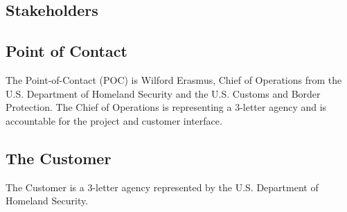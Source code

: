 \begin{fullwidth}
\section{Stakeholders}
\subsection{Point of Contact}
    The Point-of-Contact (POC) is Wilford Erasmus, Chief of Operations from the U.S. Department of Homeland Security and the U.S. Customs and Border Protection. The Chief of Operations is representing a 3-letter agency and is accountable for the project and customer interface. 

\subsection{The Customer}
    The Customer is a 3-letter agency represented by the U.S. Department of Homeland Security.


\end{fullwidth}
